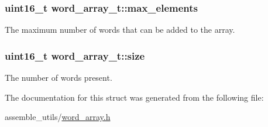 \subsubsection[{\texorpdfstring{max\+\_\+elements}{max_elements}}]{\setlength{\rightskip}{0pt plus 5cm}uint16\+\_\+t word\+\_\+array\+\_\+t\+::max\+\_\+elements}\hypertarget{structword__array__t_a6ee8bec82913800ec8b2b8d3e71d9c46}{}\label{structword__array__t_a6ee8bec82913800ec8b2b8d3e71d9c46}
The maximum number of words that can be added to the array. 
\subsubsection[{\texorpdfstring{size}{size}}]{\setlength{\rightskip}{0pt plus 5cm}uint16\+\_\+t word\+\_\+array\+\_\+t\+::size}\hypertarget{structword__array__t_a86cd7d60401db1c1aac7691a811c60e9}{}\label{structword__array__t_a86cd7d60401db1c1aac7691a811c60e9}
The number of words present. 

The documentation for this struct was generated from the following file\+:\begin{DoxyCompactItemize}
\item 
assemble\+\_\+utils/\hyperlink{word__array_8h}{word\+\_\+array.\+h}\end{DoxyCompactItemize}
